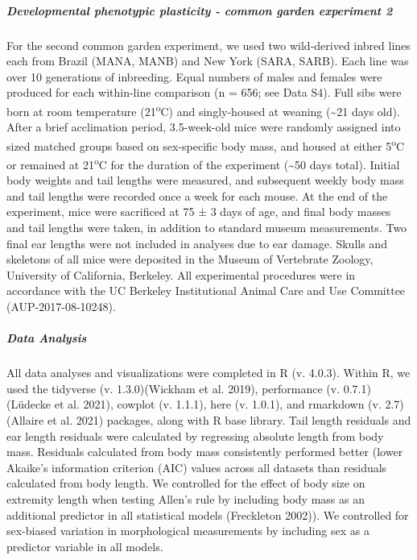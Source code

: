 \documentclass[]{article}
\let\oldsubparagraph\subparagraph
\renewcommand{\subparagraph}[1]{\oldsubparagraph{#1}\mbox{}}
\begin{document}
\hypertarget{developmental-phenotypic-plasticity---common-garden-experiment-2}{%
\subparagraph{\texorpdfstring{\emph{Developmental phenotypic plasticity
- common garden experiment
2}}{Developmental phenotypic plasticity - common garden experiment 2}}\label{developmental-phenotypic-plasticity---common-garden-experiment-2}}

For the second common garden experiment, we used two wild-derived inbred
lines each from Brazil (MANA, MANB) and New York (SARA, SARB). Each line
was over 10 generations of inbreeding. Equal numbers of males and
females were produced for each within-line comparison (n = 656; see Data
S4). Full sibs were born at room temperature (21\textsuperscript{o}C)
and singly-housed at weaning (\textasciitilde{}21 days old). After a
brief acclimation period, 3.5-week-old mice were randomly assigned into
sized matched groups based on sex-specific body mass, and housed at
either 5\textsuperscript{o}C or remained at 21\textsuperscript{o}C for
the duration of the experiment (\textasciitilde{}50 days total). Initial
body weights and tail lengths were measured, and subsequent weekly body
mass and tail lengths were recorded once a week for each mouse. At the
end of the experiment, mice were sacrificed at 75 ± 3 days of age, and
final body masses and tail lengths were taken, in addition to standard
museum measurements. Two final ear lengths were not included in analyses
due to ear damage. Skulls and skeletons of all mice were deposited in
the Museum of Vertebrate Zoology, University of California, Berkeley.
All experimental procedures were in accordance with the UC Berkeley
Institutional Animal Care and Use Committee (AUP-2017-08-10248).

\hypertarget{data-analysis}{%
\subparagraph{\texorpdfstring{\emph{Data
Analysis}}{Data Analysis}}\label{data-analysis}}

All data analyses and visualizations were completed in R (v. 4.0.3).
Within R, we used the tidyverse (v. 1.3.0)(Wickham et al. 2019),
performance (v. 0.7.1)(Lüdecke et al. 2021), cowplot (v. 1.1.1), here
(v. 1.0.1), and rmarkdown (v. 2.7)(Allaire et al. 2021) packages, along
with R base library. Tail length residuals and ear length residuals were
calculated by regressing absolute length from body mass. Residuals
calculated from body mass consistently performed better (lower Akaike's
information criterion (AIC) values across all datasets than residuals
calculated from body length. We controlled for the effect of body size
on extremity length when testing Allen's rule by including body mass as
an additional predictor in all statistical models (Freckleton 2002)). We
controlled for sex-biased variation in morphological measurements by
including sex as a predictor variable in all models.
\end{document}
